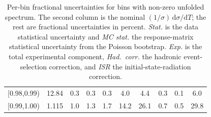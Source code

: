 \begin{table}[t!]
\begin{tabular}{c r c c c c c c c c}
{[0.98,0.99)} & 12.84 & 0.3 & 0.3 & 0.3 & 4.0 & 4.4 & 0.3 & 0.1 & 6.0 \\
{[0.99,1.00)} & 1.115 & 1.0 & 1.3 & 1.7 & 14.2 & 26.1 & 0.7 & 0.5 & 29.8 \\
\hline
\end{tabular}
\normalsize
\caption{Per-bin fractional uncertainties for bins with non-zero unfolded spectrum. The second column is the nominal $(1/\sigma)\,\mathrm{d}\sigma/\mathrm{d}T$; the rest are fractional uncertainties in percent. \textit{Stat.} is the data statistical uncertainty and \textit{MC stat.} the response-matrix statistical uncertainty from the Poisson bootstrap. \textit{Exp.} is the total experimental component, \textit{Had.\ corr.} the hadronic event-selection correction, and \textit{ISR} the initial-state-radiation correction.}
\label{tab:per_bin_uncertainty}
\end{table}